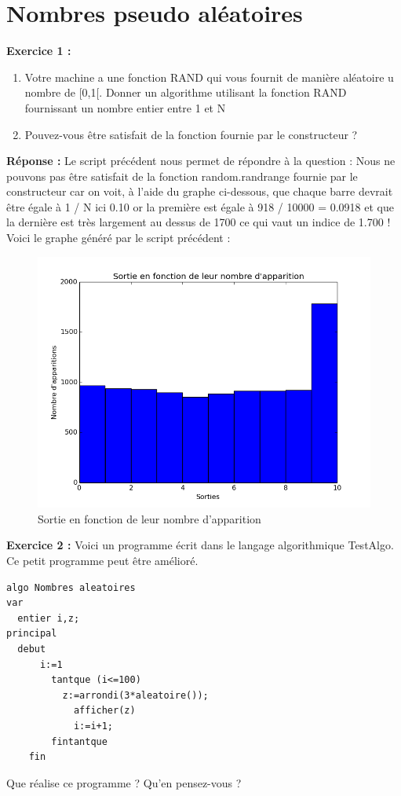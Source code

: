 \documentclass{book}
\begin{document}
\section{Nombres pseudo aléatoires}
\textbf{Exercice 1 :}
\begin{enumerate}
	\item Votre machine a une fonction RAND qui vous fournit de manière aléatoire u nombre de [0,1[. Donner un algorithme utilisant la fonction RAND fournissant un nombre entier entre 1 et N
	\item Pouvez-vous être satisfait de la fonction fournie par le constructeur ?
\end{enumerate}

\textbf{Réponse :} \newline 
Le script précédent nous permet de répondre à la question : Nous ne pouvons pas être satisfait de la fonction random.randrange fournie par le constructeur car on voit, à l'aide du graphe ci-dessous, que chaque barre devrait être égale à 1 / N ici 0.10 or la première est égale à 918 / 10000 = 0.0918 et que la dernière est très largement au dessus de 1700 ce qui vaut un indice de 1.700 !
\newpage
Voici le graphe généré par le script précédent : 
\begin{figure}[h!]
	\centering
	\includegraphics[width=\textwidth]{Nombre_pseudo-aleatoires_exo1.png}
	\caption{Sortie en fonction de leur nombre d'apparition}
	\label{fig:cc40}
\end{figure}
\newline
\textbf{Exercice 2 :}
Voici un programme écrit dans le langage algorithmique TestAlgo.
Ce petit programme peut être amélioré.
\begin{lstlisting}[frame=single]
algo Nombres aleatoires
var
  entier i,z;
principal
  debut
	  i:=1
		tantque (i<=100)
		  z:=arrondi(3*aleatoire());
			afficher(z)
			i:=i+1;
		fintantque
	fin
\end{lstlisting}
Que réalise ce programme ? Qu'en pensez-vous ?
\end{document}
